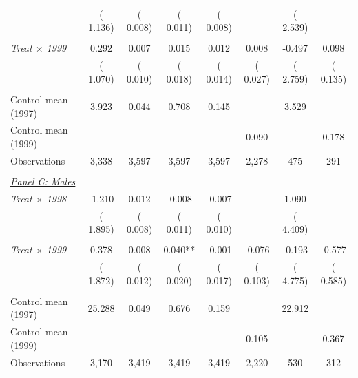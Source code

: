 \begin{tabular}{lccccccc}
 & (    1.136) & (    0.008) & (    0.011) & (    0.008) & & (    2.539) & \\ 
  & & & & & & & \\ 
\textit{Treat $\times$ 1999} & 0.292 & 0.007 & 0.015 & 0.012 & 0.008 & -0.497 & 0.098 \\ 
 & (    1.070) & (    0.010) & (    0.018) & (    0.014) & (    0.027) & (    2.759) & (    0.135) \\ 
  & & & & & & & \\ 
Control mean (1997) &     3.923 &     0.044 &     0.708 &     0.145 & &     3.529 & \\ 
Control mean (1999) & & & & &     0.090 & &     0.178 \\ 
Observations &        3,338 &        3,597 &        3,597 &        3,597 &        2,278 &          475 &          291 \\ 
  & & & & & & & \\ 
\underline{\textit{Panel C: Males}} \\ 
\textit{Treat $\times$ 1998} & -1.210 & 0.012 & -0.008 & -0.007 & & 1.090 & \\ 
 & (    1.895) & (    0.008) & (    0.011) & (    0.010) & & (    4.409) & \\ 
  & & & & & & & \\ 
\textit{Treat $\times$ 1999} & 0.378 & 0.008 & 0.040** & -0.001 & -0.076 & -0.193 & -0.577 \\ 
 & (    1.872) & (    0.012) & (    0.020) & (    0.017) & (    0.103) & (    4.775) & (    0.585) \\ 
  & & & & & & & \\ 
Control mean (1997) &    25.288 &     0.049 &     0.676 &     0.159 & &    22.912 & \\ 
Control mean (1999) & & & & &     0.105 & &     0.367 \\ 
Observations &        3,170 &        3,419 &        3,419 &        3,419 &        2,220 &          530 &          312 \\ 
\bottomrule
\end{tabular}